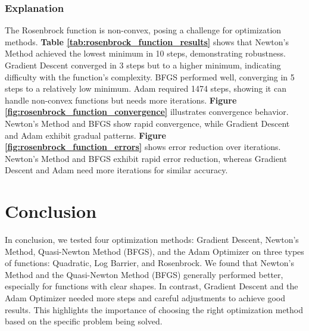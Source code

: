 \documentclass[12pt]{article}
\begin{document}
\FloatBarrier %

\subsubsection*{Explanation}
The Rosenbrock function is non-convex, posing a challenge for optimization methods. \textbf{Table \ref{tab:rosenbrock_function_results}} shows that Newton's Method achieved the lowest minimum in 10 steps, demonstrating robustness. Gradient Descent converged in 3 steps but to a higher minimum, indicating difficulty with the function's complexity. BFGS performed well, converging in 5 steps to a relatively low minimum. Adam required 1474 steps, showing it can handle non-convex functions but needs more iterations.
\textbf{Figure \ref{fig:rosenbrock_function_convergence}} illustrates convergence behavior. Newton's Method and BFGS show rapid convergence, while Gradient Descent and Adam exhibit gradual patterns.
\textbf{Figure \ref{fig:rosenbrock_function_errors}} shows error reduction over iterations. Newton's Method and BFGS exhibit rapid error reduction, whereas Gradient Descent and Adam need more iterations for similar accuracy.

\section{Conclusion} 
In conclusion, we tested four optimization methods: Gradient Descent, Newton’s Method, Quasi-Newton Method (BFGS), and the Adam Optimizer on three types of functions: Quadratic, Log Barrier, and Rosenbrock. We found that Newton’s Method and the Quasi-Newton Method (BFGS) generally performed better, especially for functions with clear shapes. In contrast, Gradient Descent and the Adam Optimizer needed more steps and careful adjustments to achieve good results. This highlights the importance of choosing the right optimization method based on the specific problem being solved.
\end{document}
